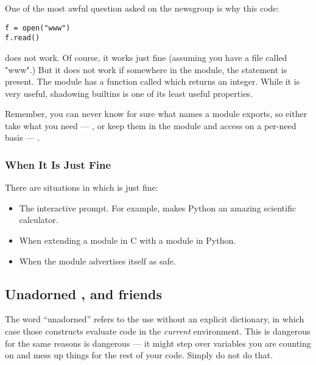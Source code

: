 \documentclass{howto}
\begin{document}
One of the most awful question asked on the newsgroup is why this code:

\begin{verbatim}
f = open("www")
f.read()
\end{verbatim}

does not work. Of course, it works just fine (assuming you have a file
called "www".) But it does not work if somewhere in the module, the
statement  is present. The  module
has a function called  which returns an integer. While
it is very useful, shadowing builtins is one of its least useful properties.

Remember, you can never know for sure what names a module exports, so either
take what you need --- , or keep them in
the module and access on a per-need basis --- 
.

\subsubsection{When It Is Just Fine}

There are situations in which  is just fine:

\begin{itemize}

\item The interactive prompt. For example,  makes
      Python an amazing scientific calculator.

\item When extending a module in C with a module in Python.

\item When the module advertises itself as  safe.

\end{itemize}

\subsection{Unadorned ,  and friends}

The word ``unadorned'' refers to the use without an explicit dictionary,
in which case those constructs evaluate code in the {\em current} environment.
This is dangerous for the same reasons  is dangerous ---
it might step over variables you are counting on and mess up things for
the rest of your code. Simply do not do that.
\end{document}
